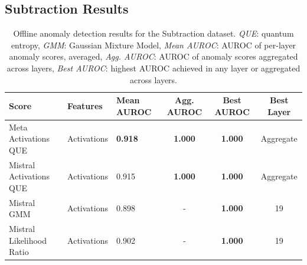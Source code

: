 \subsection{Subtraction Results}

\begin{table}[H]
\centering
\scriptsize  %
\renewcommand{\arraystretch}{1.2}  %
\setlength{\tabcolsep}{2pt}  %
\begin{tabular}{lp{3cm}lccc}
\toprule
\textbf{Score} & \textbf{Features} & \textbf{Mean AUROC} & \textbf{Agg. AUROC} & \textbf{Best AUROC} & \textbf{Best Layer} \\
\midrule
Meta Activations QUE             & Activations & \textbf{0.918}  & \textbf{1.000}  & \textbf{1.000}  & Aggregate \\ 
Mistral Activations QUE          & Activations & 0.915  & \textbf{1.000}  & \textbf{1.000}  & Aggregate \\ 
Mistral GMM & Activations & 0.898  & -  & \textbf{1.000}  & 19 \\ 
Mistral Likelihood Ratio         & Activations & 0.902  & -  & \textbf{1.000}  & 19 \\ 
\bottomrule
\end{tabular}
\caption{ Offline anomaly detection results for the Subtraction dataset. \emph{QUE}: quantum entropy, \emph{GMM}: Gaussian Mixture Model, \emph{Mean AUROC}: AUROC of per-layer anomaly scores, averaged, \emph{Agg. AUROC}: AUROC of anomaly scores aggregated across layers, \emph{Best AUROC}: highest AUROC achieved in any layer or aggregated across layers.}
\label{tab:offline_anomaly_subtraction}
\end{table}


